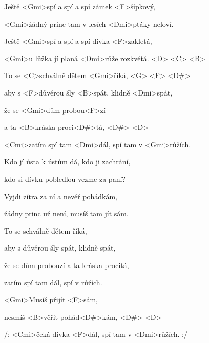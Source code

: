 

\zs
Ještě <Gmi>spí a spí a spí zámek <F>šípkový,

<Gmi>žádný princ tam v lesích <Dmi>ptáky neloví.

Ještě <Gmi>spí a spí a spí dívka <F>zakletá,

<Gmi>u lůžka jí planá <Dmi>růže rozkvétá. <D> <C> <B> 

To se <C>schválně dětem <Gmi>říká, <G> <F> <D#> 

aby s <F>důvěrou šly <B>spát, klidně <Dmi>spát,

že se <Gmi>dům probou<F>zí

a ta <B>kráska proci<D#>tá, <D#> <D> 

<Cmi>zatím spí tam <Dmi>dál, spí tam v <Gmi>růžích.
\ks

\zs
Kdo jí ústa k ústům dá, kdo ji zachrání,

kdo si dívku pobledlou vezme za paní?

Vyjdi zítra za ní a nevěř pohádkám,

žádny princ už není, musíš tam jít sám.

To se schválně dětem říká,

aby s důvěrou šly spát, klidně spát,

že se dům probouzí a ta kráska procitá,

zatím spí tam dál, spí v růžích.
\ks

\zs
<Gmi>Musíš přijít <F>sám,

nesmíš <B>věřit pohád<D#>kám, <D#> <D> 

/: <Cmi>čeká dívka <F>dál, spí tam v <Dmi>růžích. :/
\ks

\kp
